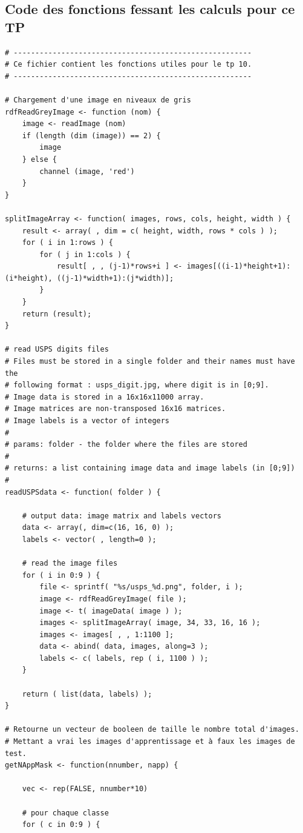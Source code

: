 \documentclass[a4paper,11pt]{article}
\begin{document}
  \subsection{Code des fonctions fessant les calculs pour ce TP}
  \begin{lstlisting}[caption=Les fonctions faisant les calculs pour ce TP]
# -------------------------------------------------------
# Ce fichier contient les fonctions utiles pour le tp 10.
# -------------------------------------------------------

# Chargement d'une image en niveaux de gris
rdfReadGreyImage <- function (nom) {
    image <- readImage (nom)
    if (length (dim (image)) == 2) {
        image
    } else {
        channel (image, 'red')
    }
}

splitImageArray <- function( images, rows, cols, height, width ) {
	result <- array( , dim = c( height, width, rows * cols ) );
	for ( i in 1:rows ) {
		for ( j in 1:cols ) {
			result[ , , (j-1)*rows+i ] <- images[((i-1)*height+1):(i*height), ((j-1)*width+1):(j*width)];
		}
	}
	return (result);
}

# read USPS digits files
# Files must be stored in a single folder and their names must have the
# following format : usps_digit.jpg, where digit is in [0;9].
# Image data is stored in a 16x16x11000 array.
# Image matrices are non-transposed 16x16 matrices.
# Image labels is a vector of integers
#
# params: folder - the folder where the files are stored
#
# returns: a list containing image data and image labels (in [0;9])
#
readUSPSdata <- function( folder ) {

	# output data: image matrix and labels vectors
	data <- array(, dim=c(16, 16, 0) );
	labels <- vector( , length=0 );

	# read the image files 
	for ( i in 0:9 ) {
		file <- sprintf( "%s/usps_%d.png", folder, i );
		image <- rdfReadGreyImage( file );
		image <- t( imageData( image ) );
		images <- splitImageArray( image, 34, 33, 16, 16 );
		images <- images[ , , 1:1100 ];
		data <- abind( data, images, along=3 );
		labels <- c( labels, rep ( i, 1100 ) );
	}

	return ( list(data, labels) );
}

# Retourne un vecteur de booleen de taille le nombre total d'images.
# Mettant a vrai les images d'apprentissage et à faux les images de test.
getNAppMask <- function(nnumber, napp) {

    vec <- rep(FALSE, nnumber*10)

    # pour chaque classe
    for ( c in 0:9 ) {


\end{lstlisting}
\end{document}
